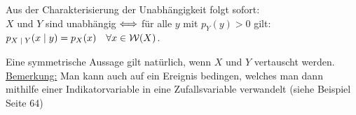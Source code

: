 \begin{lemma}
Aus der Charakterisierung der Unabhängigkeit folgt sofort: \\
$X$ und $Y$ sind unabhängig $\Longleftrightarrow$ für alle $y$ mit $p_Y(y)>0$ gilt: $p_{X \;|\; Y} (x \;|\; y) = p_X(x) \quad \forall x\in \mathcal{W}(X)$.
\end{lemma}
Eine symmetrische Aussage gilt natürlich, wenn $X$ und $Y$ vertauscht werden.\\

\underline{Bemerkung:} Man kann auch auf ein Ereignis bedingen, welches man dann mithilfe einer Indikatorvariable in eine Zufallsvariable verwandelt (siehe Beispiel Seite 64)
